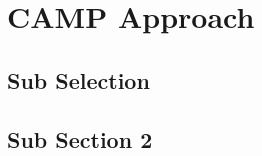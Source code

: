\section{CAMP Approach} \label{Sec:approachSection}


\subsection{Sub Selection}



\subsection{Sub Section 2}

